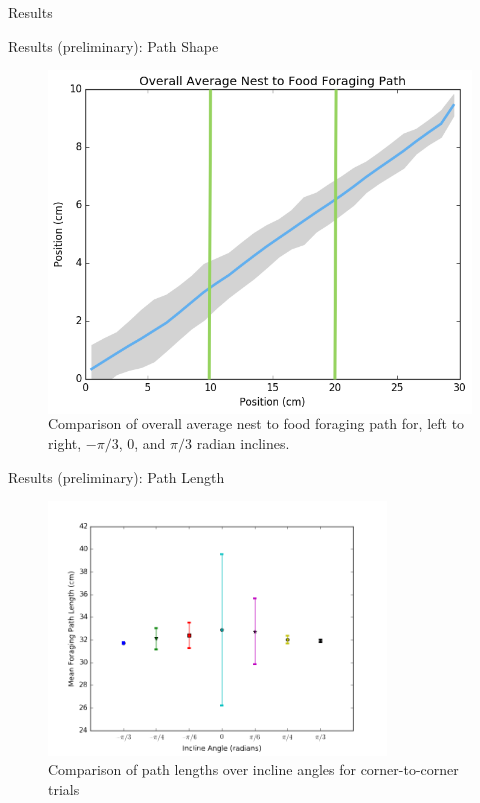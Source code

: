 \begin{section}{Results}
\begin{frame}{Results (preliminary): Path Shape}
\begin{figure}
\begin{columns}[T,onlytextwidth]
\includegraphics[width=\textwidth]{results/corner-to-corner-average_path_pidiv3.png}
\end{columns}
\caption{Comparison of overall average nest to food foraging path for, left to right, $-\pi/3$, $0$, and $\pi/3$ radian inclines.}
\end{figure}
\end{frame}


\begin{frame}{Results (preliminary): Path Length}
\begin{figure}
\includegraphics[width=0.8\textwidth]{results/corner-to-cornermeanforagingpathlength.png}
\caption{Comparison of path lengths over incline angles for corner-to-corner trials}
\end{figure}
\end{frame}


\end{section}
